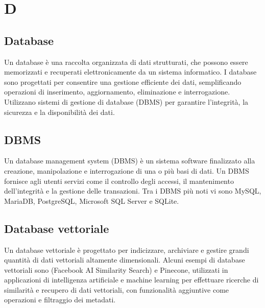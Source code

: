 \section{D}

\vspace{2em}
\subsection*{Database}
\par Un database è una raccolta organizzata di dati strutturati, che possono essere memorizzati e recuperati elettronicamente da un sistema informatico. I database sono progettati per consentire una gestione efficiente dei dati, semplificando operazioni di inserimento, aggiornamento, eliminazione e interrogazione. Utilizzano sistemi di gestione di database (DBMS) per garantire l'integrità, la sicurezza e la disponibilità dei dati.

\vspace{2em}
\subsection*{DBMS}
\par Un database management system (DBMS) è un sistema software finalizzato alla creazione, manipolazione e interrogazione di una o più basi di dati. Un DBMS fornisce agli utenti servizi come il controllo degli accessi, il mantenimento dell'integrità e la gestione delle transazioni. Tra i DBMS più noti vi sono MySQL, MariaDB, PostgreSQL, Microsoft SQL Server e SQLite.

\vspace{2em}
\subsection*{Database vettoriale}
\par Un database vettoriale è progettato per indicizzare, archiviare e gestire grandi quantità di dati vettoriali altamente dimensionali. Alcuni esempi di database vettoriali sono  (Facebook AI Similarity Search) e Pinecone, utilizzati in applicazioni di intelligenza artificiale e machine learning per effettuare ricerche di similarità e recupero di dati vettoriali, con funzionalità aggiuntive come operazioni  e filtraggio dei metadati.



